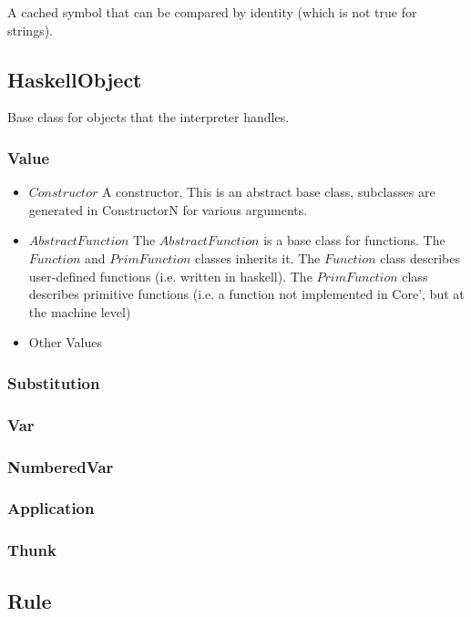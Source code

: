 A cached symbol that can be compared by identity (which is not true for strings).

\subsection*{HaskellObject}

Base class for objects that the interpreter handles.

\subsubsection*{Value}

\begin{itemize}
\item{$Constructor$} A constructor. This is an abstract base class, subclasses are 
generated in ConstructorN for various arguments.
\item{$AbstractFunction$} The $AbstractFunction$ is a base class for functions. The 
$Function$ and $PrimFunction$ classes inherits it. The $Function$ class describes
user-defined functions (i.e. written in haskell). The $PrimFunction$ class describes
primitive functions (i.e. a function not implemented in Core', but at the machine level)
\item{Other Values}
\end{itemize}

\subsubsection*{Substitution}

\subsubsection*{Var}

\subsubsection*{NumberedVar}

\subsubsection*{Application}

\subsubsection*{Thunk}

\subsection*{Rule}

